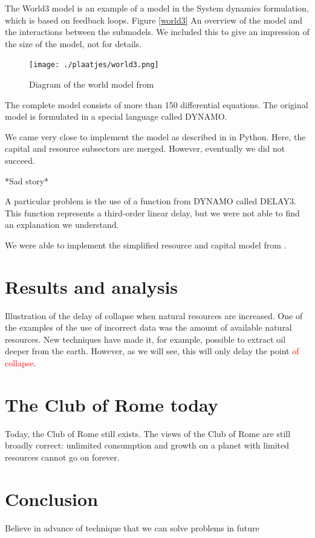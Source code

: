 \documentclass[10pt,a4paper]{scrartcl}
\begin{document}
The World3 model is an example of a model in the System dynamics formulation, which is based on feedback loops. Figure \ref{world3} An overview of the model and the interactions between the submodels. We included this to give an impression of the size of the model, not for details.

\begin{figure}
\centering
\texttt{[image: ./plaatjes/world3.png]}
\caption{Diagram of the world model from \cite{forresterworld}}
\label{standard-run}
\end{figure}

The complete model consists of more than 150 differential equations. The original model is formulated in a special language called DYNAMO.

We came very close to implement the model as described in \cite{thissen1978investigations} in Python. Here, the capital and resource subsectors are merged. However, eventually we did not succeed.

*Sad story*

A particular problem is the use of a function from DYNAMO called DELAY3. This function represents a third-order linear delay, but we were not able to find an explanation we understand.

We were able to implement the simplified resource and capital model from \cite{thissen1978investigations}.

\section*{Results and analysis}

Illustration of the delay of collapse when natural resources are increased. One of the examples of the use of incorrect data was the amount of available natural resources. New techniques have made it, for example, possible to extract oil deeper from the earth. However, as we will see, this will only delay the point \textcolor{red}{of collapse}.

\section*{The Club of Rome today}

Today, the Club of Rome still exists. The views of the Club of Rome are still broadly correct: unlimited consumption and growth on a planet with limited resources cannot go on forever.

\section*{Conclusion}

Believe in advance of technique that we can solve problems in future


\nocite{*}

\end{document}

